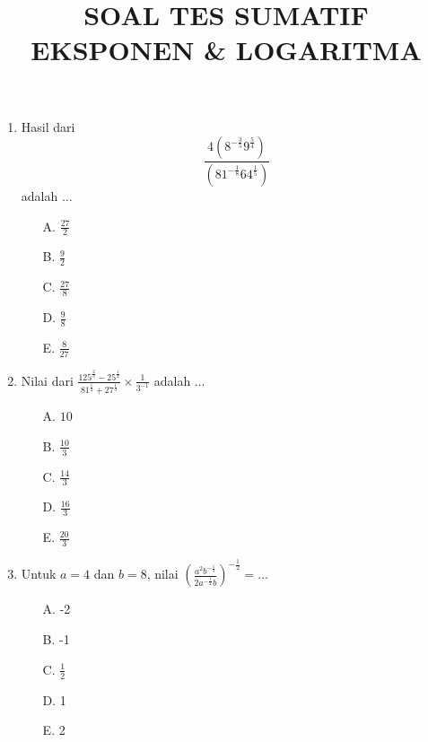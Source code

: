 \documentclass{article}
\title{\textbf{SOAL TES SUMATIF EKSPONEN \& LOGARITMA}}
\author{}
\date{}
\begin{document}
\onehalfspacing

\maketitle

\begin{enumerate}
    \item Hasil dari
    \[
        \frac{4\left(8^{-\frac{3}{5}}9^{\frac{5}{4}}\right)}
        {\left(81^{-\frac{1}{8}}64^{\frac{1}{5}}\right)}
    \]
    adalah $\dots$

    \begin{multicols}{3}
        \begin{enumerate}
            \item[A.] $\displaystyle \frac{27}{2}$
            \item[B.] $\displaystyle \frac{9}{2}$
            \item[C.] $\displaystyle \frac{27}{8}$
            \item[D.] $\displaystyle \frac{9}{8}$
            \item[E.] $\displaystyle \frac{8}{27}$
        \end{enumerate}
    \end{multicols}

    \item Nilai dari $\displaystyle \frac{125^{\frac{2}{3}}-25^{\frac{1}{2}}}{81^{\frac{1}{4}}+27^{\frac{1}{3}}}\times \frac{1}{3^{-1}}$ adalah $\dots$

    \begin{multicols}{3}
        \begin{enumerate}
            \item[A.] $\displaystyle 10$
            \item[B.] $\displaystyle \frac{10}{3}$
            \item[C.] $\displaystyle \frac{14}{3}$
            \item[D.] $\displaystyle \frac{16}{3}$
            \item[E.] $\displaystyle \frac{20}{3}$
        \end{enumerate}
    \end{multicols}

    \item Untuk $a=4$ dan $b=8$, nilai $\displaystyle \left( \frac{a^2 b^{-\frac{1}{3}}}{2a^{-\frac{1}{2}}b} \right)^{-\frac{1}{2}}=\dots$

    \begin{multicols}{3}
        \begin{enumerate}
            \item[A.] -2
            \item[B.] -1
            \item[C.] $\displaystyle \frac{1}{2}$
            \item[D.] 1
            \item[E.] 2
        \end{enumerate}
    \end{multicols}


\end{enumerate}
\end{document}
